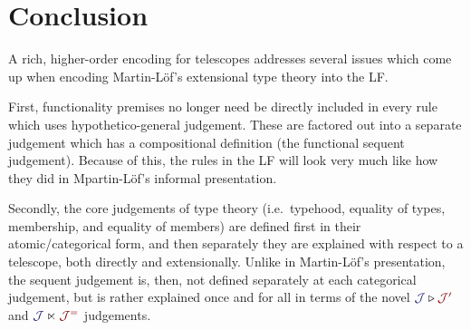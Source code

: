 \documentclass[acmtoplas]{acmtrans2m}
\def\InputModeColorName{MidnightBlue}
\def\OutputModeColorName{Maroon}
\newcommand\InputMode[1]{{\color{\InputModeColorName}{#1}}}
\newcommand\OutputMode[1]{{\color{\OutputModeColorName}{#1}}}
\newcommand\sploot[2]{\InputMode{#1}\triangleright\OutputMode{#2}}
\newcommand\refract[2]{\InputMode{#1}\ltimes\OutputMode{#2}}
\newcommand\dname[1]{\mathcal{#1}}
\begin{document}
\section{Conclusion}

A rich, higher-order encoding for telescopes addresses several issues
which come up when encoding Martin-L\"of's extensional type theory
into the LF.

First, functionality premises no longer need be directly included in
every rule which uses hypothetico-general judgement. These are
factored out into a separate judgement which has a compositional
definition (the functional sequent judgement). Because of this, the
rules in the LF will look very much like how they did in
Mpartin-L\"of's informal presentation.

Secondly, the core judgements of type theory (i.e.\ typehood, equality
of types, membership, and equality of members) are defined first in
their atomic/categorical form, and then separately they are explained
with respect to a telescope, both directly and extensionally. Unlike
in Martin-L\"of's presentation, the sequent judgement is, then, not
defined separately at each categorical judgement, but is rather
explained once and for all in terms of the novel
$\sploot{\dname{J}}{\dname{J}'}$ and
$\refract{\dname{J}}{\dname{J}^=}$ judgements.

\bigskip


\nocite{*}

\end{document}
